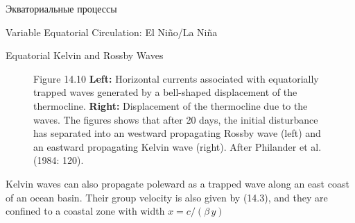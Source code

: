 \begin{chapter}{Экваториальные процессы}
\begin{section}{Variable Equatorial Circulation: El Ni\~{n}o/La Ni\~{n}a}
\begin{paragraph}{Equatorial Kelvin and Rossby Waves}
\begin{figure}[t!]
\caption{Figure 14.10 \textbf{Left:} Horizontal currents associated
with equatorially trapped waves generated by a bell-shaped
displacement of the thermocline.
\textbf{Right:} Displacement of the
thermocline due to the waves. The
figures shows that after 20 days, the initial disturbance has
separated into an westward propagating Rossby wave
(left) and an eastward propagating Kelvin wave
(right). After Philander et al. (1984: 120).}
\label{fig:rossbycurrents}
\end{figure}
%
%

Kelvin waves can also propagate poleward as a trapped wave along an
east coast of an ocean basin. Their group velocity is also given by
(14.3), and they are confined to a coastal zone with width
$x=c/\left(\beta\,y\right)$
%


\end{paragraph}
\end{section}
\end{chapter}
